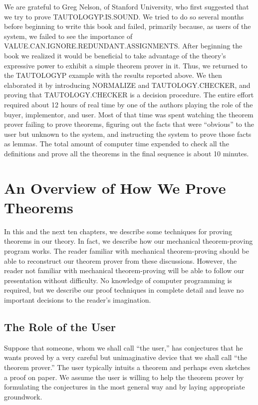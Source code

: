 \documentclass[10pt]{book}
\begin{document}
We are grateful to Greg Nelson, of Stanford University, who first
suggested that we try to prove  TAUTOLOGYP.IS.SOUND.  We tried to do so
several months before beginning to write this book and failed, primarily
because, as users of the system, we failed to see the importance of
VALUE.CAN.IGNORE.REDUNDANT.ASSIGNMENTS.  After beginning the book we
realized it would be beneficial to take advantage of the
theory's expressive power to exhibit a simple theorem prover in it.
Thus, we returned to the TAUTOLOGYP example with the results reported above.
We then elaborated it by introducing NORMALIZE and TAUTOLOGY.CHECKER,
and proving that TAUTOLOGY.CHECKER is a decision procedure.
The entire effort required
about 12 hours of real time by one of the authors playing the role of
the buyer, implementor, and user.  Most of that time was spent
watching the theorem prover failing to prove theorems, figuring out the facts
that were ``obvious'' to the user but unknown to the system, and instructing
the system to prove those facts as lemmas.
The total amount of computer
time expended to check all the   definitions and prove all the theorems
in the final sequence
is about 10 minutes.

\chapter{An Overview of How We Prove Theorems}
\pagestyle{headings}
\label{SECPROVE}
In this and the next ten chapters, we describe some techniques
for proving theorems in our theory.  In fact, we describe how
our mechanical theorem-proving program works.  The reader familiar with mechanical
theorem-proving should be able to reconstruct our theorem prover from these
discussions.  However, the reader
not familiar with mechanical theorem-proving will be able to follow our
presentation without difficulty.
No knowledge of computer programming is required, but we describe
our proof techniques in complete detail and leave no important
decisions to the reader's imagination.
\section{The Role of the User}
Suppose that someone, whom we shall call ``the user,'' has
conjectures that he wants  proved by a very
careful but unimaginative device that we shall call ``the
theorem prover.''
The user typically intuits a theorem and perhaps
even sketches a proof on paper.
We assume the user is willing to help
the theorem prover by formulating the conjectures in the most general
way and by laying appropriate groundwork.
\end{document}
